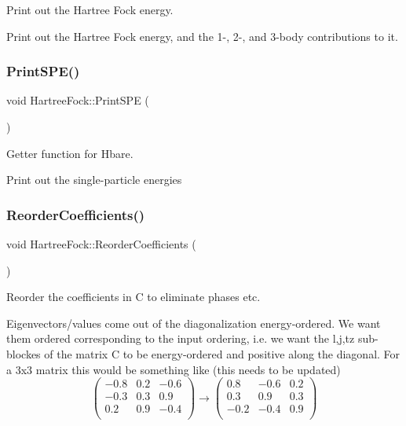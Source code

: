Print out the Hartree Fock energy. 

Print out the Hartree Fock energy, and the 1-\/, 2-\/, and 3-\/body contributions to it. \mbox{\label{classHartreeFock_ab96b85eca26bf7c57430242201066932}} 
\subsubsection{\texorpdfstring{Print\+S\+P\+E()}{PrintSPE()}}
{\footnotesize\ttfamily void Hartree\+Fock\+::\+Print\+S\+PE (\begin{DoxyParamCaption}{ }\end{DoxyParamCaption})}



Getter function for Hbare. 

Print out the single-\/particle energies \mbox{\label{classHartreeFock_a2eb6754f57250a03a2e1bd3e2aef4daf}} 
\subsubsection{\texorpdfstring{Reorder\+Coefficients()}{ReorderCoefficients()}}
{\footnotesize\ttfamily void Hartree\+Fock\+::\+Reorder\+Coefficients (\begin{DoxyParamCaption}{ }\end{DoxyParamCaption})}



Reorder the coefficients in C to eliminate phases etc. 

Eigenvectors/values come out of the diagonalization energy-\/ordered. We want them ordered corresponding to the input ordering, i.\+e. we want the l,j,tz sub-\/blockes of the matrix C to be energy-\/ordered and positive along the diagonal. For a 3x3 matrix this would be something like (this needs to be updated) \[ \left( \begin{array}{rrr} -0.8 & 0.2 & -0.6 \\ -0.3 & 0.3 & 0.9 \\ 0.2 & 0.9 & -0.4 \\ \end{array}\right) \rightarrow \left(\begin{array}{rrr} 0.8 & -0.6 & 0.2 \\ 0.3 & 0.9 & 0.3 \\ -0.2 & -0.4 & 0.9 \\ \end{array}\right) \] \mbox{\label{classHartreeFock_a0666507747c17845ab4f74b97414703c}} 
